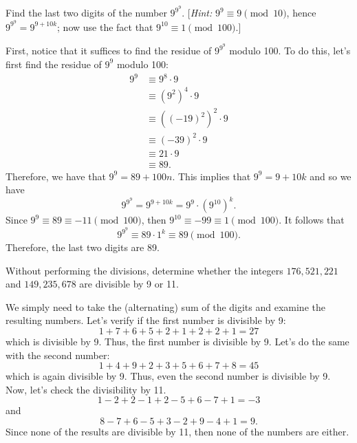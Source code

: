 \begin{exercise}
    Find the last two digits of the number $9^{9^9}$. [\textit{Hint:} $9^9 \equiv 9 \pmod{10}$, hence $9^{9^9} = 9^{9 + 10k}$; now use the fact that $9^{10} \equiv 1 \pmod{100}$.]\\
\end{exercise}

\begin{solution}
    First, notice that it suffices to find the residue of $9^{9^9}$ modulo 100. To do this, let's first find the residue of $9^9$ modulo 100:
    \begin{align*}
        9^9 &\equiv 9^8\cdot 9 \\
        &\equiv (9^2)^4\cdot 9 \\
        &\equiv ((-19)^2)^2 \cdot 9 \\
        &\equiv (-39)^2\cdot 9 \\
        &\equiv 21 \cdot 9 \\ 
        &\equiv 89.
    \end{align*} 
    Therefore, we have that $9^9 = 89 + 100n$. This implies that $9^9 = 9 + 10k$ and so we have
    $$9^{9^9} = 9^{9 + 10k} = 9^9 \cdot (9^{10})^k.$$
    Since $9^9 \equiv 89 \equiv -11 \pmod{100}$, then $9^{10} \equiv -99 \equiv 1 \pmod{100}$. It follows that 
    $$9^{9^9} \equiv 89 \cdot 1^k \equiv 89 \pmod{100}.$$
    Therefore, the last two digits are 89.\\
\end{solution}

\begin{exercise}
    Without performing the divisions, determine whether the integers $176,521,221$ and $149,235,678$ are divisible by 9 or 11. \\
\end{exercise}

\begin{solution}
    We simply need to take the (alternating) sum of the digits and examine the resulting numbers. Let's verify if the first number is divisible by 9:
    $$1 + 7 + 6 + 5 + 2 + 1 + 2 + 2 + 1 = 27$$
    which is divisible by 9. Thus, the first number is divisible by 9. Let's do the same with the second number:
    $$1 + 4 + 9 + 2 + 3 + 5 + 6 + 7 + 8 = 45$$
    which is again divisible by 9. Thus, even the second number is divisible by 9. Now, let's check the divisibility by 11.
    $$1 -2 + 2 - 1 + 2 - 5 + 6 - 7 + 1 = -3$$
    and
    $$8 - 7 + 6 - 5 + 3 - 2 + 9 - 4 + 1 = 9.$$
    Since none of the results are divisible by 11, then none of the numbers are either. \\
\end{solution}


